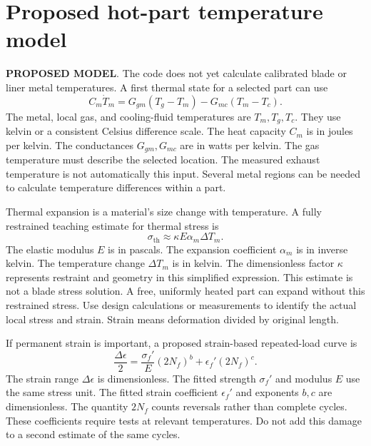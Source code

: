 \documentclass[11pt,a4paper]{report}
\newcommand{\proposed}{\textbf{\textcolor{reportblue}{PROPOSED MODEL}}}
\begin{document}
\section{Proposed hot-part temperature model}
\proposed. The code does not yet calculate calibrated blade or liner metal temperatures.
A first thermal state for a selected part can use
\begin{equation}
C_m\dot T_m=G_{gm}(T_g-T_m)-G_{mc}(T_m-T_c).
\end{equation}
The metal, local gas, and cooling-fluid temperatures are $T_m,T_g,T_c$.
They use kelvin or a consistent Celsius difference scale.
The heat capacity $C_m$ is in joules per kelvin.
The conductances $G_{gm},G_{mc}$ are in watts per kelvin.
The gas temperature must describe the selected location.
The measured exhaust temperature is not automatically this input.
Several metal regions can be needed to calculate temperature differences within a part.

Thermal expansion is a material's size change with temperature.
A fully restrained teaching estimate for thermal stress is
\begin{equation}
\sigma_{\mathrm{th}}\approx \kappa E\alpha_m\Delta T_m.
\end{equation}
The elastic modulus $E$ is in pascals.
The expansion coefficient $\alpha_m$ is in inverse kelvin.
The temperature change $\Delta T_m$ is in kelvin.
The dimensionless factor $\kappa$ represents restraint and geometry in this simplified expression.
This estimate is not a blade stress solution.
A free, uniformly heated part can expand without this restrained stress.
Use design calculations or measurements to identify the actual local stress and strain.
Strain means deformation divided by original length.

If permanent strain is important, a proposed strain-based repeated-load curve is
\begin{equation}
\frac{\Delta\epsilon}{2}=
\frac{\sigma_f'}{E}(2N_f)^b+\epsilon_f'(2N_f)^c.
\end{equation}
The strain range $\Delta\epsilon$ is dimensionless.
The fitted strength $\sigma_f'$ and modulus $E$ use the same stress unit.
The fitted strain coefficient $\epsilon_f'$ and exponents $b,c$ are dimensionless.
The quantity $2N_f$ counts reversals rather than complete cycles.
These coefficients require tests at relevant temperatures.
Do not add this damage to a second estimate of the same cycles.
\end{document}
